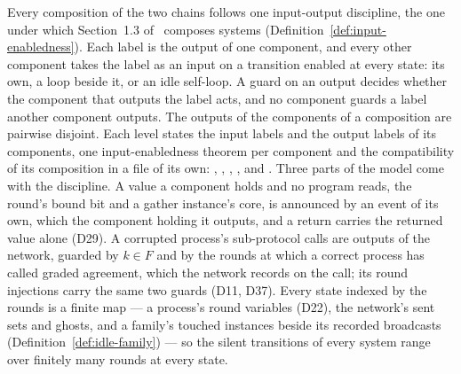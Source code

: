 Every composition of the two chains follows one input-output discipline, the one
under which Section~1.3 of~\cite{LeslieBP} composes systems
(Definition~\ref{def:input-enabledness}).
Each label is the output of one component, and every other component
takes the label as an input on a transition enabled at every state: its own, a loop
beside it, or an idle self-loop.
A guard on an output decides whether the component that outputs the label acts, and no
component guards a label another component outputs.
The outputs of the components of a composition are pairwise disjoint.
Each level states the input labels and the output labels of its components, one
input-enabledness theorem per component and the compatibility of its composition in
a file of its own: ,
,
,
,
 and
.
Three parts of the model come with the discipline.
A value a component holds and no program reads, the round's bound bit and a gather
instance's core, is announced by an event of its own, which the component holding it
outputs, and a return carries the returned value alone (D29).
A corrupted process's sub-protocol calls are outputs of the network, guarded by
$k \in F$ and by the rounds at which a correct process has called graded agreement,
which the network records on the call; its round injections carry the same two guards
(D11, D37).
Every state indexed by the rounds is a finite map --- a process's round variables
(D22), the network's sent sets and ghosts, and a family's touched instances beside its
recorded broadcasts (Definition~\ref{def:idle-family}) --- so the silent transitions of
every system range over finitely many rounds at every state.

